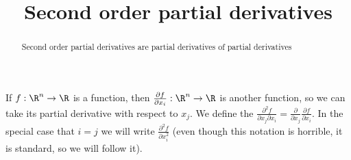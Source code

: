\documentclass{ximera}
\title{Second order partial derivatives}
\begin{document}
	\begin{abstract}
		Second order partial derivatives are partial derivatives of partial derivatives
	\end{abstract}
	
	\begin{definition}
		If $f:\R^n \to \R$ is a function, then $\frac{\partial f}{\partial x_i}:\R^n \to \R$ is another function, so we can take its partial derivative with respect to $x_j$.
		We define the  $\frac{\partial^2 f}{\partial x_j \partial x_i} = \frac{\partial}{\partial x_j} \frac{\partial f}{\partial x_i}$.  In the special case
		that $i=j$ we will write $\frac{\partial^2 f}{\partial x_i^2}$ (even though this notation is horrible, it is standard, so we will follow it).
	\end{definition}
	
\end{document}
